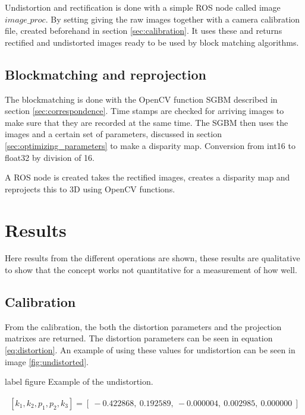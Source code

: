 Undistortion and rectification is done with a simple ROS node called image $image\_proc$. By setting giving the raw images together with a camera calibration file, created beforehand in section \ref{sec:calibration}. It uses these and returns rectified and undistorted images ready to be used by block matching algorithms.

\subsection{Blockmatching and reprojection}

The blockmatching is done with the OpenCV function SGBM described in section \ref{sec:correspondence}. Time stamps are checked for arriving images to make sure that they are recorded at the same time. The SGBM then uses the images and a certain set of parameters, discussed in section \ref{sec:optimizing_parameters} to make a disparity map. Conversion from int16 to float32 by division of 16.


A ROS node is created takes the rectified images, creates a disparity map and reprojects this to 3D using OpenCV functions.

\section{Results}

Here results from the different operations are shown, these results are qualitative to show that the concept works not quantitative for a measurement of how well.

\subsection{Calibration}

From the calibration, the both the distortion parameters and the projection matrixes are returned. The distortion parameters can be seen in equation \ref{eq:distortion}. An example of using these values for undistortion can be seen in image \ref{fig:undistorted}.

label figure   Example of the undistortion.


\begin{equation}\label{eq:distortion}
\begin{split}
[ k_{1}, k_{2}, p_{1}, p_{2}, k_{3} ] = [\ -0.422868,\ 0.192589,\ -0.000004,\ 0.002985,\ 0.000000\ ]
\end{split}
\end{equation} 

